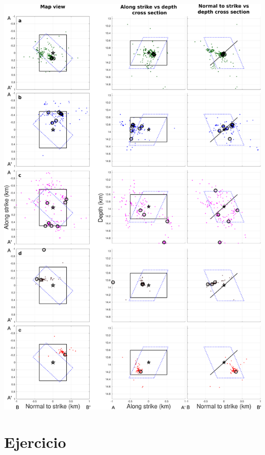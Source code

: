 \documentclass{beamer}
\begin{document}
\begin{frame}
\begin{minipage}{0.5\linewidth}
   \includegraphics[width=0.95\linewidth]{images/map_clusters_templates.pdf}
 \end{minipage} 
 
\end{frame}




\section{Ejercicio}
\end{document}
